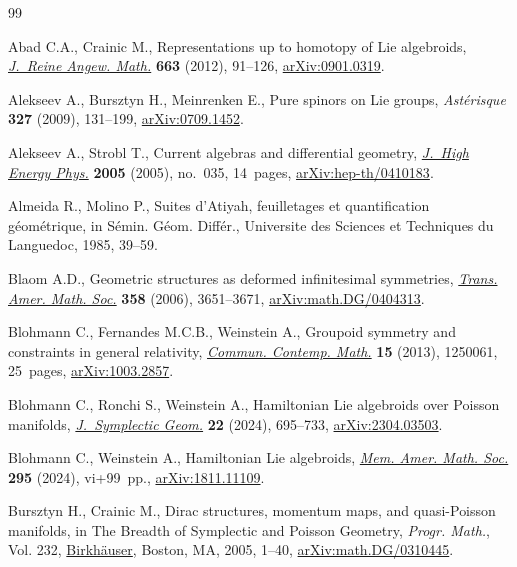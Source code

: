 \documentclass[pdftex]{sigma}
\numberwithin{equation}{section}
\begin{document}
\begin{thebibliography}{99}
\footnotesize\itemsep=0pt

Abad C.A., Crainic M., Representations up to homotopy of {L}ie algebroids,
 \href{https://doi.org/10.1515/CRELLE.2011.095}{\textit{J.~Reine Angew. Math.}} \textbf{663} (2012), 91--126,
 \href{https://arxiv.org/abs/0901.0319}{arXiv:0901.0319}.

Alekseev A., Bursztyn H., Meinrenken E., Pure spinors on {L}ie groups,
 \textit{Ast\'erisque} \textbf{327} (2009), 131--199, \href{https://arxiv.org/abs/0709.1452}{arXiv:0709.1452}.

Alekseev A., Strobl T., Current algebras and differential geometry,
 \href{https://doi.org/10.1088/1126-6708/2005/03/035}{\textit{J.~High Energy Phys.}} \textbf{2005} (2005), no.~035, 14~pages,
 \href{https://arxiv.org/abs/hep-th/0410183}{arXiv:hep-th/0410183}.

Almeida R., Molino P., Suites d'Atiyah, feuilletages et quantification
 g\'eom\'etrique, in S\'{e}min. G\'{e}om. Diff\'{e}r., Universite des Sciences
 et Techniques du Languedoc, 1985, 39--59.

Blaom A.D., Geometric structures as deformed infinitesimal symmetries,
 \href{https://doi.org/10.1090/S0002-9947-06-04057-8}{\textit{Trans. Amer. Math. Soc.}} \textbf{358} (2006), 3651--3671,
 \href{https://arxiv.org/abs/math.DG/0404313}{arXiv:math.DG/0404313}.

Blohmann C., Fernandes M.C.B., Weinstein A., Groupoid symmetry and constraints
 in general relativity, \href{https://doi.org/10.1142/S0219199712500617}{\textit{Commun. Contemp. Math.}} \textbf{15} (2013),
 1250061, 25~pages, \href{https://arxiv.org/abs/1003.2857}{arXiv:1003.2857}.

Blohmann C., Ronchi S., Weinstein A., Hamiltonian {L}ie algebroids over
 {P}oisson manifolds, \href{https://doi.org/10.4310/jsg.241021220342}{\textit{J.~Symplectic Geom.}} \textbf{22} (2024),
 695--733, \href{https://arxiv.org/abs/2304.03503}{arXiv:2304.03503}.

Blohmann C., Weinstein A., Hamiltonian {L}ie algebroids, \href{https://doi.org/10.1090/memo/1474}{\textit{Mem. Amer.
 Math. Soc.}} \textbf{295} (2024), vi+99~pp., \href{https://arxiv.org/abs/1811.11109}{arXiv:1811.11109}.

Bursztyn H., Crainic M., Dirac structures, momentum maps, and quasi-{P}oisson
 manifolds, in The {B}readth of {S}ymplectic and {P}oisson {G}eometry,
 \textit{Progr. Math.}, Vol. 232, \href{https://doi.org/10.1007/0-8176-4419-9_1}{Birkh\"auser}, Boston, MA, 2005, 1--40,
 \href{https://arxiv.org/abs/math.DG/0310445}{arXiv:math.DG/0310445}.


\end{thebibliography}
\end{document}
